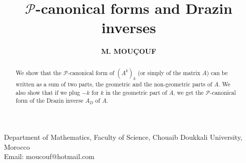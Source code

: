 \documentclass[12pt]{amsart}
\title{$\mathcal{P}$-canonical forms and Drazin inverses}
\author{\bf M. MOU\c{C}OUF}
\date{}
\theoremstyle{definition}
\numberwithin{equation}{section}
\numberwithin{equation}{section}
\begin{document}
\maketitle
\begin{center}
{\footnotesize Department of Mathematics, Faculty of Science, Chouaib Doukkali University,\\Morocco\\
Email: moucouf@hotmail.com}
\end{center}
\begin{abstract}
 We show that the  $\mathcal{P}$-canonical form of $(A^{k})_{k}$ (or simply of the matrix $A$) can be written as a sum of two parts, the geometric and the non-geometric parts of $A$. We also show that if we plug $-k$ for $k$ in the geometric part of $A$, we get the $\mathcal{P}$-canonical form of the Drazin inverse $A_{D}$ of $A$.
\end{abstract}
\end{document}
